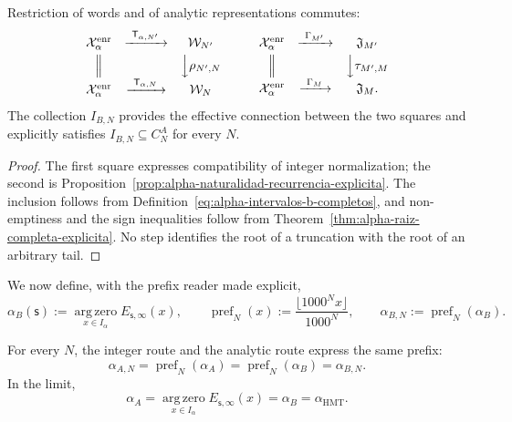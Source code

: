 \begin{proposition}
\label{prop:alpha-cuadrados-compatibilidad}
Restriction of words and of analytic representations commutes:
\[
\begin{array}{ccc}
 \mathcal X_\alpha^{\mathrm{enr}}&
 \xrightarrow{\ \mathsf T_{\alpha,N'}\ }&\mathcal W_{N'}\\[1mm]
 \Big\Vert&&\Big\downarrow\rho_{N',N}\\[1mm]
 \mathcal X_\alpha^{\mathrm{enr}}&
 \xrightarrow{\ \mathsf T_{\alpha,N}\ }&\mathcal W_N
\end{array}
\qquad
\begin{array}{ccc}
 \mathcal X_\alpha^{\mathrm{enr}}&
 \xrightarrow{\ \Gamma_{M'}\ }&\mathfrak J_{M'}\\[1mm]
 \Big\Vert&&\Big\downarrow\tau_{M',M}\\[1mm]
 \mathcal X_\alpha^{\mathrm{enr}}&
 \xrightarrow{\ \Gamma_M\ }&\mathfrak J_M .
\end{array}
\]
The collection \(I_{B,N}\) provides the effective connection between the two
squares and explicitly satisfies
\(I_{B,N}\subseteq C_N^A\) for every \(N\).
\end{proposition}

\begin{proof}
The first square expresses compatibility of integer normalization; the second
is Proposition~\ref{prop:alpha-naturalidad-recurrencia-explicita}. The inclusion
follows from Definition~\eqref{eq:alpha-intervalos-b-completos},
and non-emptiness and the sign inequalities follow from
Theorem~\ref{thm:alpha-raiz-completa-explicita}. No step identifies the
root of a truncation with the root of an arbitrary tail.
\end{proof}

We now define, with the prefix reader made explicit,
\begin{equation}
 \alpha_B(\mathsf s):=
 \operatorname*{arg\,zero}_{x\in I_\alpha}E_{\mathsf s,\infty}(x),
 \qquad
 \operatorname{pref}_N(x):=
 \frac{\lfloor1000^Nx\rfloor}{1000^N},
 \qquad
 \alpha_{B,N}:=\operatorname{pref}_N(\alpha_B).
 \label{eq:alpha-definicion-b-y-prefijos-rev08}
\end{equation}

\begin{theorem}
\label{prop:alpha-dos-limites}
For every \(N\), the integer route and the analytic route express the same prefix:
\begin{equation}
 \boxed{\alpha_{A,N}=\operatorname{pref}_N(\alpha_A)
 =\operatorname{pref}_N(\alpha_B)=\alpha_{B,N}.}
 \label{eq:alpha-dos-vias-cada-nivel}
\end{equation}
In the limit,
\begin{equation}
 \boxed{\alpha_A
 =\operatorname*{arg\,zero}_{x\in I_\alpha}
       E_{\mathsf s,\infty}(x)
 =\alpha_B=\alpha_{\mathrm{HMT}}.}
 \label{eq:alpha-dos-vias-limite-coinductivo}
\end{equation}
\end{theorem}


